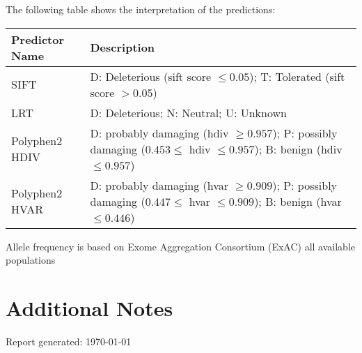 \documentclass[10pt]{article}
\begin{document}
\bigskip
\noindent The following table shows the interpretation of the predictions:
\newline
\bigskip
\newline
\footnotesize
\def\arraystretch{1.5}
\begin{tabular}{|l|p{5.75in}|}
  \hline
  \textbf{Predictor Name} & \textbf{Description} \\ \hline
  SIFT & D: Deleterious (sift score $\leq 0.05$); T: Tolerated (sift score $> 0.05$) \\ \hline
  LRT & D: Deleterious; N: Neutral; U: Unknown \\ \hline
  Polyphen2 HDIV & D: probably damaging (hdiv $\geq 0.957$); P: possibly damaging ($0.453 \leq$ hdiv $\leq 0.957$); B: benign (hdiv $\leq 0.957$) \\ \hline
  Polyphen2 HVAR & D: probably damaging (hvar $\geq 0.909$); P: possibly damaging ($0.447 \leq$ hvar $\leq 0.909$); B: benign (hvar $\leq 0.446$) \\ \hline
\end{tabular}
\bigskip
\newline
\noindent*Allele frequency is based on Exome Aggregation Consortium (ExAC) all available populations
\normalsize
\bigskip

\section*{Additional Notes}
\noindent {}
\bigskip
\newline \noindent Report generated: \today
\end{document}
